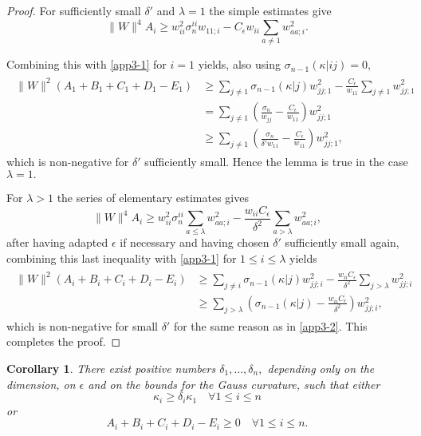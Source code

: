 \documentclass{amsart}
\newtheorem{corollary}[theorem]{Corollary}
\theoremstyle{definition}
\theoremstyle{remark}
\numberwithin{equation}{section}
\begin{document}
\begin{proof}
For sufficiently small $\delta'$ and $\lambda=1$ the simple estimates \cite[Equ.~(4.19), (4.20)]{Guan} give
\begin{equation}
\|W\|^4A_i\geq w_{ii}^2\sigma_n^{ii}w_{11;i}-C_{\epsilon}w_{ii}\sum_{a\neq 1}w_{aa;i}^2.
\end{equation}

Combining this with \eqref{app3-1} for $i=1$ yields, also using $\sigma_{n-1}(\kappa|ij)=0,$
\begin{align}\begin{split}\label{app3-2}
\|W\|^2(A_1+B_1+C_1+D_1-E_1)&\geq \sum_{j\neq 1} \sigma_{n-1}(\kappa|j)w_{jj;1}^2-\frac{C_{\epsilon}}{w_{11}}\sum_{j\neq 1}w_{jj;1}^2\\
		&=\sum_{j\neq 1}\left(\frac{\sigma_n}{w_{jj}}-\frac{C_{\epsilon}}{w_{11}}\right)w_{jj;1}^2\\
        &\geq \sum_{j\neq 1}\left(\frac{\sigma_n}{\delta' w_{11}}-\frac{C_{\epsilon}}{w_{11}}\right)w_{jj;1}^2,
\end{split}\end{align}
which is non-negative for $\delta'$ sufficiently small. Hence the lemma is true in the case $\lambda=1.$

For $\lambda>1$ the series of elementary estimates \cite[Equ.~(4.22)-(4.27)]{Guan} gives
\[
\|W\|^4A_i\geq w_{ii}^2\sigma_n^{ii}\sum_{a\leq\lambda}w_{aa;i}^2-\frac{w_{ii}C_{\epsilon}}{\delta^2}\sum_{a>\lambda}w_{aa;i}^2,
\]
after having adapted $\epsilon$ if necessary and having chosen $\delta'$ sufficiently small
again, combining this last inequality with \eqref{app3-1} for $1\leq i\leq \lambda$ yields
\begin{align}\begin{split}
\|W\|^2(A_i+B_i+C_i+D_i-E_i)&\geq \sum_{j\neq i}\sigma_{n-1}(\kappa|j)w_{jj;i}^2-\frac{w_{ii}C_{\epsilon}}{\delta^2}\sum_{j>\lambda}w_{jj;i}^2\\
			&\geq \sum_{j>\lambda}\left(\sigma_{n-1}(\kappa|j)-\frac{w_{ii}C_{\epsilon}}{\delta^2}\right)w_{jj;i}^2,
\end{split}\end{align}
which is non-negative for small $\delta'$ for the same reason as in \eqref{app3-2}. This completes the proof.

\end{proof}

\begin{corollary}\label{Alternative}
There exist positive numbers $\delta_1,\dots,\delta_n,$ depending only on the dimension, on $\epsilon$ and on the bounds for the Gauss curvature, such that either
\begin{equation}
\kappa_i\geq \delta_i\kappa_1\quad\forall 1\leq i\leq n
\end{equation}
or
\begin{equation}
A_i+B_i+C_i+D_i-E_i\geq 0\quad\forall 1\leq i\leq n.
\end{equation}
\end{corollary}
\end{document}
